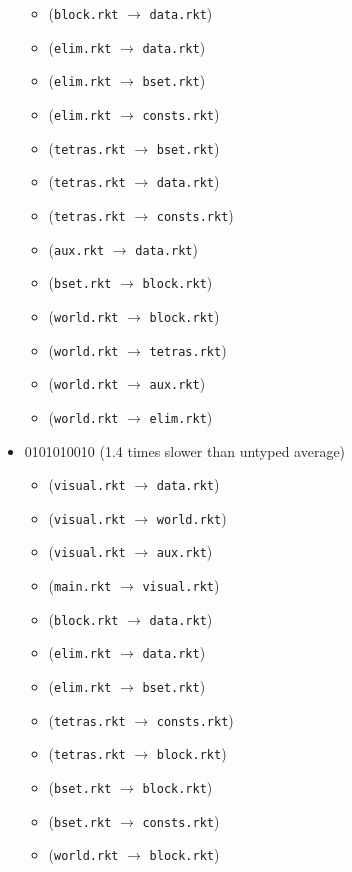 \documentclass{article}
\newcommand{\mono}[1]{\texttt{#1}}
\begin{document}
\begin{itemize}
\begin{itemize}
  \item (\mono{block.rkt} $\rightarrow$ \mono{data.rkt})
  \item (\mono{elim.rkt} $\rightarrow$ \mono{data.rkt})
  \item (\mono{elim.rkt} $\rightarrow$ \mono{bset.rkt})
  \item (\mono{elim.rkt} $\rightarrow$ \mono{consts.rkt})
  \item (\mono{tetras.rkt} $\rightarrow$ \mono{bset.rkt})
  \item (\mono{tetras.rkt} $\rightarrow$ \mono{data.rkt})
  \item (\mono{tetras.rkt} $\rightarrow$ \mono{consts.rkt})
  \item (\mono{aux.rkt} $\rightarrow$ \mono{data.rkt})
  \item (\mono{bset.rkt} $\rightarrow$ \mono{block.rkt})
  \item (\mono{world.rkt} $\rightarrow$ \mono{block.rkt})
  \item (\mono{world.rkt} $\rightarrow$ \mono{tetras.rkt})
  \item (\mono{world.rkt} $\rightarrow$ \mono{aux.rkt})
  \item (\mono{world.rkt} $\rightarrow$ \mono{elim.rkt})
  \end{itemize}
\item 0101010010 (1.4 times slower than untyped average)
  \begin{itemize}
  \item (\mono{visual.rkt} $\rightarrow$ \mono{data.rkt})
  \item (\mono{visual.rkt} $\rightarrow$ \mono{world.rkt})
  \item (\mono{visual.rkt} $\rightarrow$ \mono{aux.rkt})
  \item (\mono{main.rkt} $\rightarrow$ \mono{visual.rkt})
  \item (\mono{block.rkt} $\rightarrow$ \mono{data.rkt})
  \item (\mono{elim.rkt} $\rightarrow$ \mono{data.rkt})
  \item (\mono{elim.rkt} $\rightarrow$ \mono{bset.rkt})
  \item (\mono{tetras.rkt} $\rightarrow$ \mono{consts.rkt})
  \item (\mono{tetras.rkt} $\rightarrow$ \mono{block.rkt})
  \item (\mono{bset.rkt} $\rightarrow$ \mono{block.rkt})
  \item (\mono{bset.rkt} $\rightarrow$ \mono{consts.rkt})
  \item (\mono{world.rkt} $\rightarrow$ \mono{block.rkt})

\end{itemize}
\end{itemize}
\end{document}
